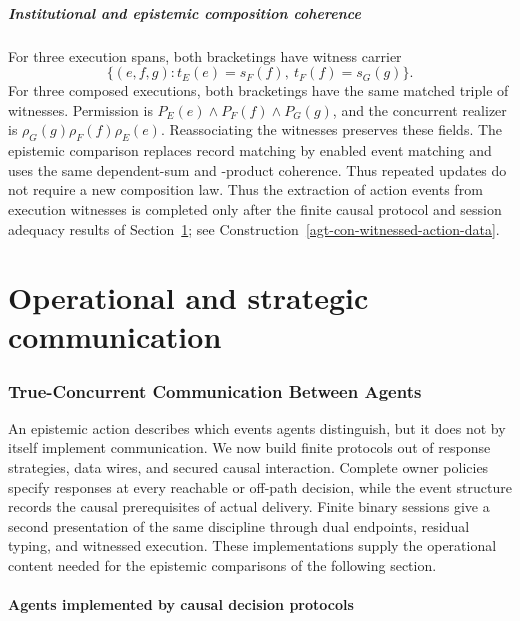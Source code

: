 \documentclass[11pt,a4paper]{article}
\numberwithin{equation}{section}
\theoremstyle{definition}
\theoremstyle{remark}
\theoremstyle{plain}
\begin{document}
\subsubsection{Institutional and epistemic composition coherence}

For three execution spans, both bracketings have witness carrier
\[
 \{(e,f,g):t_E(e)=s_F(f),\ t_F(f)=s_G(g)\}.
\]
For three composed executions, both bracketings have the same
matched triple of witnesses. Permission is
$P_E(e)\wedge P_F(f)\wedge P_G(g)$, and the concurrent realizer is
$\rho_G(g)\rho_F(f)\rho_E(e)$. Reassociating the witnesses
preserves these fields. The epistemic comparison replaces record
matching by enabled event matching and uses the same dependent-sum and
-product coherence. Thus repeated updates do not require a new
composition law.
Thus the extraction of action events from execution witnesses is
completed only after the finite causal protocol and session adequacy
results of Section~\ref{sec:paper-10}; see
Construction~\ref{agt-con-witnessed-action-data}.


\part{Operational and strategic communication}

\section{True-Concurrent Communication Between Agents}\label{sec:paper-10}

An epistemic action describes which events agents distinguish,
but it does not by itself implement communication. We now build finite
protocols out of response strategies, data wires, and secured causal
interaction. Complete owner policies specify responses at every
reachable or off-path decision, while the event structure records the
causal prerequisites of actual delivery. Finite binary sessions give a
second presentation of the same discipline through dual endpoints,
residual typing, and witnessed execution. These implementations supply
the operational content needed for the epistemic comparisons of the
following section.

\subsection{Agents implemented by causal decision protocols}
\end{document}
